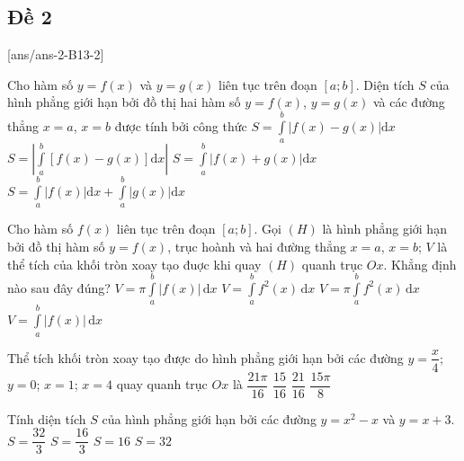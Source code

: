 \subsection{Đề 2}
[ans/ans-2-B13-2]
\caulc
\begin{ex}%
	Cho hàm số $y=f(x)$ và $y=g(x)$ liên tục trên đoạn $[a;b]$. Diện tích $S$ của hình phẳng giới hạn bởi đồ thị hai hàm số $y=f(x)$, $y=g(x)$ và các đường thẳng $x=a$, $x=b$ được tính bởi công thức	
	\choice
	{\True $\displaystyle S=\int\limits_a^b |f(x)-g(x)| \mathrm dx$}
	{$\displaystyle S= \left|\int\limits_a^b [f(x)-g(x)]\mathrm dx\right|$}
	{$\displaystyle S=\int\limits_a^b |f(x)+g(x)|\mathrm dx$}
	{$\displaystyle S=\int\limits_a^b |f(x)|\mathrm dx+\int\limits_a^b |g(x)|\mathrm dx$}
\end{ex}
\begin{ex}%
	Cho hàm số $ f(x)$ liên tục trên đoạn $ \left[a;b\right]$. Gọi $ (H)$ là hình phẳng giới hạn bởi đồ thị hàm số $ y=f(x)$, trục hoành và hai đường thẳng $ x=a$, $x=b$; $ V$ là thể tích của khối tròn xoay tạo đuợc khi quay $ (H)$ quanh trục $ Ox$. Khẳng định nào sau đây đúng?
	\choice
	{$ V=\pi \displaystyle\int\limits_{a}^{b} \left|f(x)\right|\mathrm{\,d}x$}
	{$ V=\displaystyle\int\limits_{a}^{b}f^2(x)\mathrm{\,d}x$}
	{\True $ V=\pi \displaystyle\int\limits_{a}^{b}f^2(x)\mathrm{\,d}x$}
	{$ V=\displaystyle\int\limits_{a}^{b}\left|f(x)\right|\mathrm{\,d}x$}
\end{ex} 
\begin{ex}%
	Thể tích khối tròn xoay tạo được do hình phẳng giới hạn bởi các đường $ y=\dfrac{x}{4}$; $y=0$; $x=1$; $x=4 $ quay quanh trục $ Ox $ là
	\choice
	{\True $ \dfrac{21\pi}{16} $}
	{$ \dfrac{15}{16} $}
	{$ \dfrac{21}{16} $}
	{$ \dfrac{15\pi}{8} $}
\end{ex}
\begin{ex}%
	Tính diện tích $S$ của hình phẳng giới hạn bởi các đường $y = x^2 - x$ và $y = x + 3$.
	\choice
	{\True $S = \dfrac{32}{3}$}
	{$S = \dfrac{16}{3}$}
	{$S = 16$}
	{$S = 32$}
\end{ex}
